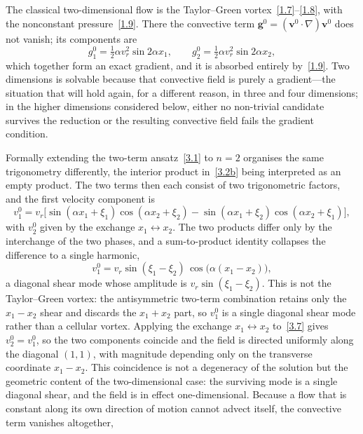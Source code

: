 \documentclass[11pt]{jfm}
\numberwithin{equation}{section}
\begin{document}
The classical two-dimensional flow is the Taylor--Green vortex~\eqref{1.7}--\eqref{1.8}, with the
nonconstant pressure~\eqref{1.9}. There the convective term $\boldsymbol{g}^0
=(\boldsymbol{v}^0\!\cdot\!\nabla)\boldsymbol{v}^0$ does not vanish; its components are
\[
g_1^0=\tfrac{1}{2}\alpha v_r^2\sin 2\alpha x_1,
\qquad
g_2^0=\tfrac{1}{2}\alpha v_r^2\sin 2\alpha x_2,
\]
which together form an exact gradient, and it is absorbed entirely by~\eqref{1.9}. Two dimensions is solvable because that
convective field is purely a gradient---the situation that will hold again, for a different
reason, in three and four dimensions; in the higher dimensions considered below, either no
non-trivial candidate survives the reduction or the resulting convective field fails the gradient
condition.

Formally extending the two-term ansatz~\eqref{3.1} to $n=2$ organises the same trigonometry
differently, the interior product in~\eqref{3.2b} being interpreted as an empty product. The two
terms then each consist of two trigonometric factors, and the first velocity component is
\begin{equation}
\label{3.6}
v_1^0 = v_r\bigl[\sin(\alpha x_1+\xi_1)\cos(\alpha x_2+\xi_2)-\sin(\alpha x_1+\xi_2)\cos(\alpha x_2+\xi_1)\bigr],
\end{equation}
with $v_2^0$ given by the exchange $x_1\leftrightarrow x_2$. The two products differ only by the
interchange of the two phases, and a sum-to-product identity collapses the difference to a single
harmonic,
\begin{equation}
\label{3.7}
v_1^0 = v_r\sin(\xi_1-\xi_2)\,\cos\!\bigl(\alpha(x_1-x_2)\bigr),
\end{equation}
a diagonal shear mode whose amplitude is $v_r\sin(\xi_1-\xi_2)$. This is not the Taylor--Green
vortex: the antisymmetric two-term combination retains only the $x_1-x_2$ shear and discards the
$x_1+x_2$ part, so $v_1^0$ is a single diagonal shear mode rather than a cellular vortex. Applying
the exchange $x_1\leftrightarrow x_2$ to~\eqref{3.7} gives $v_2^0 = v_1^0$, so the two components
coincide and the field is directed uniformly along the diagonal $(1,1)$, with magnitude depending
only on the transverse coordinate $x_1-x_2$. This coincidence is not a degeneracy of the solution
but the geometric content of the two-dimensional case: the surviving mode is a single diagonal
shear, and the field is in effect one-dimensional. Because a flow that is constant along its own
direction of motion cannot advect itself, the convective term vanishes altogether,
\end{document}
